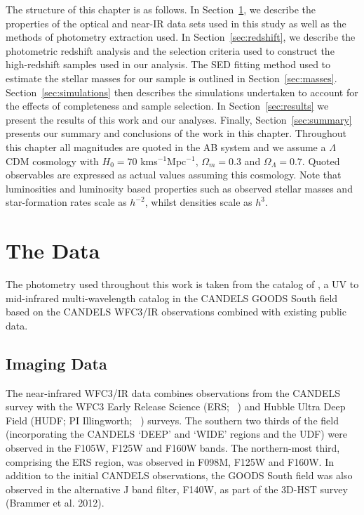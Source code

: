 The structure of this chapter is as follows. In Section~\ref{sec:data}, we describe the properties of the optical and near-IR data sets used in this study as well as the methods of photometry extraction used. In Section~\ref{sec:redshift}, we describe the photometric redshift analysis and the selection criteria used to construct the high-redshift samples used in our analysis. The SED fitting method used to estimate the stellar masses for our sample is outlined in Section~\ref{sec:masses}. Section~\ref{sec:simulations} then describes the simulations undertaken to account for the effects of completeness and sample selection. In Section~\ref{sec:results} we present the results of this work and our analyses. Finally, Section~\ref{sec:summary} presents our summary and conclusions of the work in this chapter.
Throughout this chapter all magnitudes are quoted in the AB system \citep{1983ApJ...266..713O} and we assume a $\Lambda$CDM cosmology with $H_{0} = 70$ kms$^{-1}$Mpc$^{-1}$, $\Omega_{m}=0.3$ and $\Omega_{\Lambda}=0.7$. Quoted observables are expressed as actual values assuming this cosmology. Note that luminosities and luminosity based properties such as observed stellar masses and star-formation rates scale as $h^{-2}$, whilst densities scale as $h^{3}$.

\section{The Data}\label{sec:data}
The photometry used throughout this work is taken from the catalog of \citet{Guo:2013ig}, a UV to mid-infrared multi-wavelength catalog in the CANDELS GOODS South field based on the CANDELS WFC3/IR observations combined with existing public data.

\subsection{Imaging Data}
The near-infrared WFC3/IR data combines observations from the CANDELS survey \citep{2011ApJS..197...35G,Koekemoer:2011br} with the WFC3 Early Release Science (ERS; \citeauthor{2011ApJS..193...27W}~\citeyear{2011ApJS..193...27W}) and Hubble Ultra Deep Field (HUDF; PI Illingworth; \citeauthor{Bouwens:2010dk}~\citeyear{Bouwens:2010dk}) surveys. The southern two thirds of the field (incorporating the CANDELS `DEEP' and `WIDE' regions and the UDF) were observed in the F105W, F125W and F160W bands. The northern-most third, comprising the ERS region, was observed in F098M, F125W and F160W. In addition to the initial CANDELS observations, the GOODS South field was also observed in the alternative J band filter, F140W, as part of the 3D-HST survey (Brammer et al. 2012).

